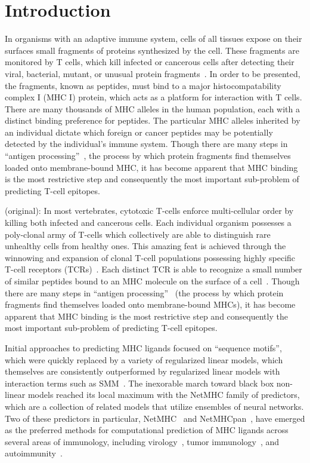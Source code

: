 \section{Introduction}
In organisms with an adaptive immune system, cells of all tissues expose on their surfaces small fragments of proteins synthesized by the cell. These fragments are monitored by T cells, which kill infected or cancerous cells after detecting their viral, bacterial, mutant, or unusual protein fragments~\cite{Anderson_2004}. In order to be presented, the fragments, known as peptides, must bind to a major histocompatability complex I (MHC I) protein, which acts as a platform for interaction with T cells. There are many thousands of MHC alleles in the human population, each with a distinct binding preference for peptides. The particular MHC alleles inherited by an individual dictate which foreign or cancer peptides may be potentially detected by the individual's immune system. Though there are many steps in ``antigen processing''~\cite{Cresswell_2005}, the process by which protein fragments find themselves loaded onto membrane-bound MHC, it has become apparent that MHC binding is the most restrictive step and consequently the most important sub-problem of predicting T-cell epitopes. 

(original): In most vertebrates, cytotoxic T-cells enforce multi-cellular order by killing both infected and cancerous cells. Each individual organism possesses a poly-clonal army of T-cells which collectively are able to distinguish rare unhealthy cells from healthy ones. This amazing feat is achieved through the winnowing and expansion of clonal T-cell populations possessing highly specific T-cell receptors (TCRs)~\cite{Blackman_1990}. Each distinct TCR is able to recognize a small number of similar peptides bound to an MHC molecule on the surface of a cell~\cite{Huseby_2005}. Though there are many steps in ``antigen processing''~\cite{Cresswell_2005} (the process by which protein fragments find themselves loaded onto membrane-bound MHCs), it has become apparent that MHC binding is the most restrictive step and consequently the most important sub-problem of predicting T-cell epitopes. 

Initial approaches to predicting MHC ligands focused on ``sequence motifs''\cite{Sette_1989}, which were quickly replaced by a variety of regularized linear models, which themselves are consistently outperformed by regularized linear models with interaction terms such as SMM~\cite{Peters_2003}. The inexorable march toward black box non-linear models reached its local maximum with the NetMHC family of predictors, which are a collection of related models that utilize ensembles of neural networks. Two of these predictors in particular, NetMHC~\cite{Lundegaard_2008} and NetMHCpan~\cite{Nielsen_2007}, have emerged as the preferred methods for computational prediction of MHC ligands across several areas of immunology, including virology~\cite{Lund_2011}, tumor immunology~\cite{Gubin_2015}, and autoimmunity~\cite{Abreu_2012}. 

